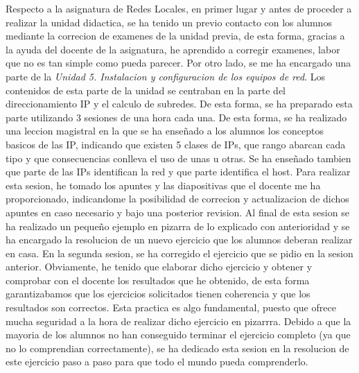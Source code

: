 \documentclass[spanish,12pt, a4paper,twoside]{paper}
\begin{document}
\justify
Respecto a la asignatura de Redes Locales, en primer lugar y antes de proceder a realizar la unidad didactica, se ha tenido un previo contacto con los alumnos mediante la correcion de examenes de la unidad previa, de esta forma, gracias a la ayuda del docente de la asignatura, he aprendido a corregir examenes, labor que no es tan simple como pueda parecer.
\justify
Por otro lado, se me ha encargado una parte de la \textit{Unidad 5. Instalacion y configuracion de los equipos de red}. Los contenidos de esta parte de la unidad se centraban en la parte del direccionamiento IP y el calculo de subredes. De esta forma, se ha preparado esta parte utilizando 3 sesiones de una hora cada una. De esta forma, se ha realizado una leccion magistral en la que se ha enseñado a los alumnos los conceptos basicos de las IP, indicando que existen 5 clases de IPs, que rango abarcan cada tipo y que consecuencias conlleva el uso de unas u otras. Se ha enseñado tambien que parte de las IPs identifican la red y que parte identifica el host. Para realizar esta sesion, he tomado los apuntes y las diapositivas que el docente me ha proporcionado, indicandome la posibilidad de correcion y actualizacion de dichos apuntes en caso necesario y bajo una posterior revision. Al final de esta sesion se ha realizado un pequeño ejemplo en pizarra de lo explicado con anterioridad y se ha encargado la resolucion de un nuevo ejercicio que los alumnos deberan realizar en casa.
\justify
En la segunda sesion, se ha corregido el ejercicio que se pidio en la sesion anterior. Obviamente, he tenido que elaborar dicho ejercicio y obtener y comprobar con el docente los resultados que he obtenido, de esta forma garantizabamos que los ejercicios solicitados tienen coherencia y que los resultados son correctos. Esta practica es algo fundamental, puesto que ofrece mucha seguridad a la hora de realizar dicho ejercicio en pizarrra. Debido a que la mayoria de los alumnos no han conseguido terminar el ejercicio completo (ya que no lo comprendian correctamente), se ha dedicado esta sesion en la resolucion de este ejercicio paso a paso para que todo el mundo pueda comprenderlo.
\end{document}

